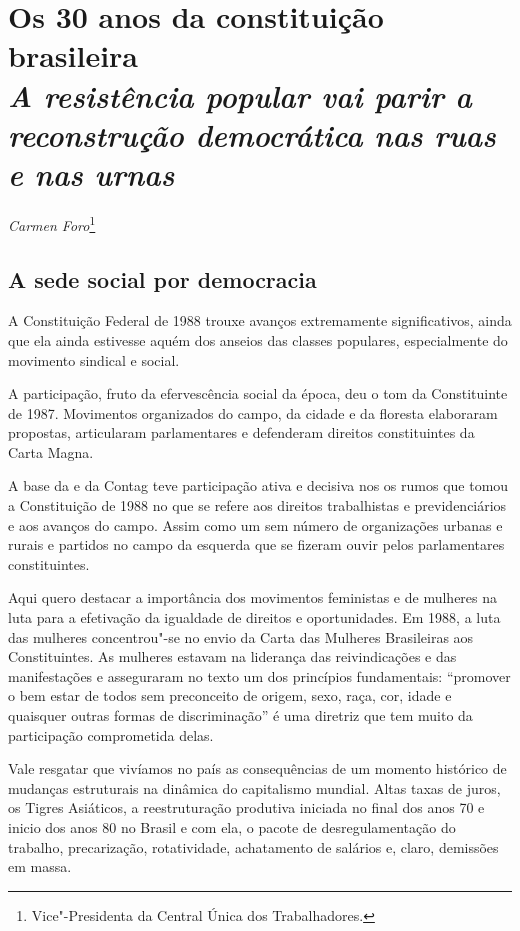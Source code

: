 \chapter*{Os 30 anos da constituição brasileira\\
\emph{A resistência popular vai parir a reconstrução democrática nas
ruas e nas urnas}}


\begin{flushright}
\emph{Carmen Foro}\footnote{Vice"-Presidenta da Central Única dos Trabalhadores.}
\end{flushright}

\section{A sede social por democracia}

A Constituição Federal de 1988 trouxe avanços extremamente
significativos, ainda que ela ainda estivesse aquém dos anseios das
classes populares, especialmente do movimento sindical e social.

A participação, fruto da efervescência social da época, deu o tom da
Constituinte de 1987. Movimentos organizados do campo, da cidade e da
floresta elaboraram propostas, articularam parlamentares e defenderam
direitos constituintes da Carta Magna.

A base da  e da Contag teve participação ativa e decisiva nos os
rumos que tomou a Constituição de 1988 no que se refere aos direitos
trabalhistas e previdenciários e aos avanços do campo. Assim como um sem
número de organizações urbanas e rurais e partidos no campo da esquerda
que se fizeram ouvir pelos parlamentares constituintes.

Aqui quero destacar a importância dos movimentos feministas e de
mulheres na luta para a efetivação da igualdade de direitos e
oportunidades. Em 1988, a luta das mulheres concentrou"-se no
envio da Carta das Mulheres Brasileiras aos
Constituintes. As mulheres estavam na liderança das reivindicações e das
manifestações e asseguraram no texto um dos princípios fundamentais:
``promover o bem estar de todos sem preconceito de origem, sexo, raça,
cor, idade e quaisquer outras formas de discriminação'' é uma diretriz
que tem muito da participação comprometida delas.

Vale resgatar que vivíamos no país as consequências de um momento
histórico de mudanças estruturais na dinâmica do capitalismo mundial.
Altas taxas de juros, os Tigres Asiáticos, a reestruturação produtiva
iniciada no final dos anos 70 e inicio dos anos 80 no Brasil e com ela,
o pacote de desregulamentação do trabalho, precarização, rotatividade,
achatamento de salários e, claro, demissões em massa.


